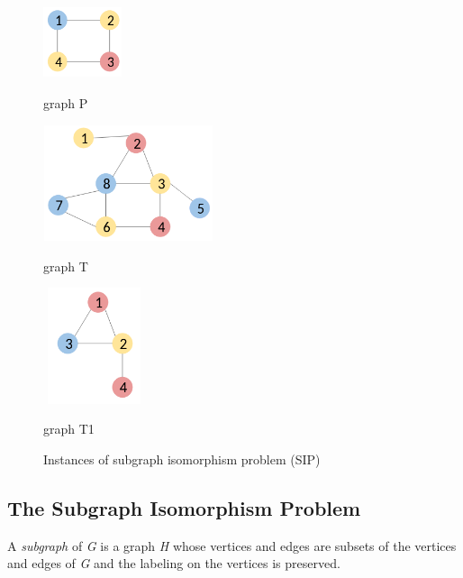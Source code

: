 \documentclass{l4proj}
\newcounter{example}[section]
\begin{document}
\begin{figure}[H]
\centering
\begin{minipage}[t]{.3\textwidth}
  \centering
  \includegraphics[height=2.1cm,width=2.3cm]{images/graphs/exampleGraph2.png}
  \caption{graph P}
  \label{fig:exampleGraph2}
\end{minipage}%
\begin{minipage}[t]{.4\textwidth}
  \centering
  \includegraphics[height=3.4cm,width=5cm]{images/graphs/exampleGraph.png}
  \caption{graph T}
  \label{fig:exampleGraph}
\end{minipage}%
\begin{minipage}[t]{.3\textwidth}
  \centering
  \includegraphics[height=3.4cm,width=3cm]{images/graphs/smalltarget.png}
  \caption{graph T1}
  \label{fig:exampleGraph}
\end{minipage}%
\caption{Instances of subgraph isomorphism problem (SIP)}
\label{fig:SIP}
\end{figure}

\subsection{The Subgraph Isomorphism Problem}
A \emph{subgraph} of \emph{G} is a graph \emph{H} whose vertices and edges are subsets of the vertices and edges of \emph{G} and the labeling on the vertices is preserved.
\end{document}
